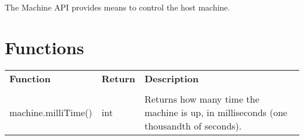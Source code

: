 The Machine API provides means to control the host machine.

\section{Functions}

\begin{tabularx}{\textwidth}{l l X}
	\textbf{\large Function} & \textbf{\large Return} & \textbf{\large Description}
	\\ \\
	\endhead
	machine.milliTime() & int & Returns how many time the machine is up, in milliseconds (one thousandth of seconds).
\end{tabularx}